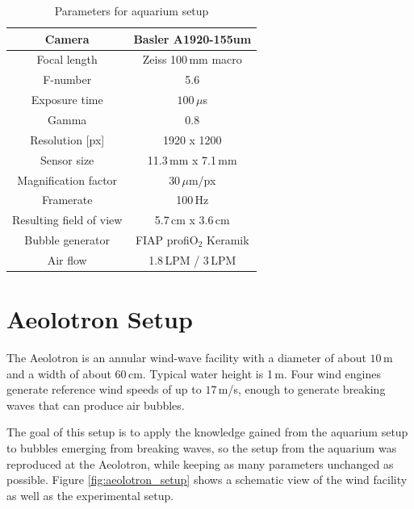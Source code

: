 		\begin{table}[h]
			\centering
		
			\begin{tabular}{|c|c|}
			\hline 
			Camera & Basler A1920-155um \\ 
			\hline 
			Focal length & Zeiss 100\,mm macro \\ 
			\hline 
			F-number & 5.6 \\ 
			\hline 
			Exposure time & $100 \, \mu$s \\ 
			\hline 
			Gamma & 0.8 \\
			\hline
			Resolution [px] &1920 x 1200 \\
			\hline 
			Sensor size & 11.3\,mm x 7.1\,mm \\
			\hline 
			Magnification factor & $30 \, \mu$m/px \\ 
			\hline 
			Framerate & 100\,Hz \\ 
			\hline 
			Resulting field of view & 5.7\,cm x 3.6\,cm \\
			\hline
			Bubble generator & FIAP profiO$_2$ Keramik\\			
			\hline
			Air flow & 1.8\,LPM / 3\,LPM \\ 
			\hline
			\end{tabular} 
			
			\caption{Parameters for aquarium setup}
			\label{tab:aquarium_param}

		\end{table}
		
	\section{Aeolotron Setup}\label{aeolotron_setup}
		The Aeolotron is an annular wind-wave facility with a diameter of about $10$\,m and a width of about $60$\,cm. Typical water height is 1\,m. Four wind engines generate reference wind speeds of up to $17$\,m/s, enough to generate breaking waves that can produce air bubbles. 
		
		The goal of this setup is to apply the knowledge gained from the aquarium setup to bubbles emerging from breaking waves, so the setup from the aquarium was reproduced at the Aeolotron, while keeping as many parameters unchanged as possible. Figure \ref{fig:aeolotron_setup} shows a schematic view of the wind facility as well as the experimental setup. 
		
